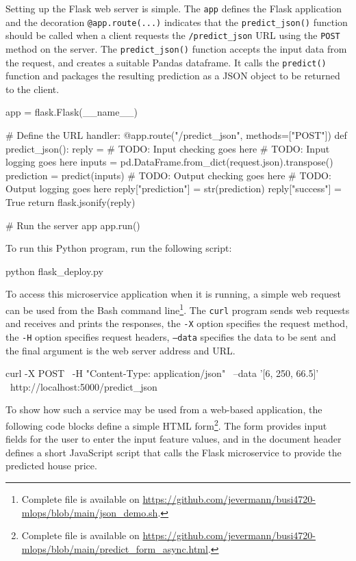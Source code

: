 \begin{withcode}
Setting up the Flask web server is simple. The \texttt{app} defines the Flask application and the decoration \texttt{@app.route(...)} indicates that the \texttt{predict\_json()} function should be called when a client requests the \texttt{/predict\_json} URL using the \texttt{POST} method on the server. The \texttt{predict\_json()} function accepts the input data from the request, and creates a suitable Pandas dataframe. It calls the \texttt{predict()} function and packages the resulting prediction as a JSON object to be returned to the client. 

\begin{pythoncode}
app = flask.Flask(__name__)

# Define the URL handler:
@app.route("/predict_json", methods=["POST"])
def predict_json():
    reply = {}
    # TODO: Input checking goes here
    # TODO: Input logging goes here
    inputs = pd.DataFrame.from_dict(request.json).transpose()
    prediction = predict(inputs)
    # TODO: Output checking goes here
    # TODO: Output logging goes here
    reply["prediction"] = str(prediction)
    reply["success"] = True
    return flask.jsonify(reply)

# Run the server app
app.run()
\end{pythoncode}

To run this Python program, run the following script:

\begin{bashcode}
python flask_deploy.py
\end{bashcode}


To access this microservice application when it is running, a simple web request can be used from the Bash command line\footnote{Complete file is available on \url{https://github.com/jevermann/busi4720-mlops/blob/main/json_demo.sh}.}. The \texttt{curl} program sends web requests and receives and prints the responses, the \texttt{-X} option specifies the request method, the \texttt{-H} option specifies request headers, \texttt{--data} specifies the data to be sent and the final argument is the web server address and URL. 

\begin{bashcode}
curl -X POST \
     -H "Content-Type: application/json" \
     --data '[6, 250, 66.5]' \
     http://localhost:5000/predict_json
\end{bashcode}

To show how such a service may be used from a web-based application, the following code blocks define a simple HTML form\footnote{Complete file is available on \url{https://github.com/jevermann/busi4720-mlops/blob/main/predict_form_async.html}.}. The form provides input fields for the user to enter the input feature values, and in the document header defines a short JavaScript script that calls the Flask microservice to provide the predicted house price. 


\end{withcode}
